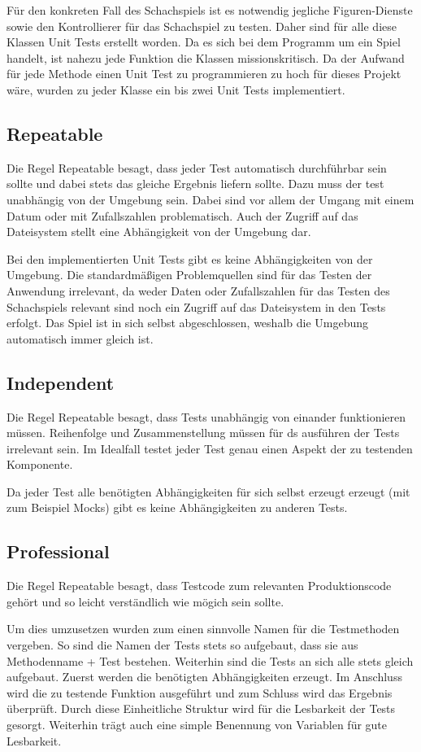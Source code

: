 Für den konkreten Fall des Schachspiels ist es notwendig jegliche Figuren-Dienste sowie den Kontrollierer für das Schachspiel zu testen. Daher sind für alle diese Klassen Unit Tests erstellt worden. Da es sich bei dem Programm um ein Spiel handelt, ist nahezu jede Funktion die Klassen missionskritisch. Da der Aufwand für jede Methode einen Unit Test zu programmieren zu hoch für dieses Projekt wäre, wurden zu jeder Klasse ein bis zwei Unit Tests implementiert.

\subsection{Repeatable}
Die Regel \glqq{}Repeatable\grqq{} besagt, dass jeder Test automatisch durchführbar sein sollte und dabei stets das gleiche Ergebnis liefern sollte. Dazu muss der test unabhängig von der Umgebung sein. Dabei sind vor allem der Umgang mit einem Datum oder mit Zufallszahlen problematisch. Auch der Zugriff auf das Dateisystem stellt eine Abhängigkeit von der Umgebung dar.

Bei den implementierten Unit Tests gibt es keine Abhängigkeiten von der Umgebung. Die standardmäßigen Problemquellen sind für das Testen der Anwendung irrelevant, da weder Daten oder Zufallszahlen für das Testen des Schachspiels relevant sind noch ein Zugriff auf das Dateisystem in den Tests erfolgt. Das Spiel ist in sich selbst abgeschlossen, weshalb die Umgebung automatisch immer gleich ist.

\subsection{Independent}
Die Regel \glqq{}Repeatable\grqq{} besagt, dass Tests unabhängig von einander funktionieren müssen. Reihenfolge und Zusammenstellung müssen für ds ausführen der Tests irrelevant sein. Im Idealfall testet jeder Test genau einen Aspekt der zu testenden Komponente.

Da jeder Test alle benötigten Abhängigkeiten für sich selbst erzeugt erzeugt (mit zum Beispiel Mocks) gibt es keine Abhängigkeiten zu anderen Tests.

\subsection{Professional}
Die Regel \glqq{}Repeatable\grqq{} besagt, dass Testcode zum relevanten Produktionscode gehört und so leicht verständlich wie mögich sein sollte.

Um dies umzusetzen wurden zum einen sinnvolle Namen für die Testmethoden vergeben. So sind die Namen der Tests stets so aufgebaut, dass sie aus Methodenname + \glqq{}Test\grqq{} bestehen. Weiterhin sind die Tests an sich alle stets gleich aufgebaut. Zuerst werden die benötigten Abhängigkeiten erzeugt. Im Anschluss wird die zu testende Funktion ausgeführt und zum Schluss wird das Ergebnis überprüft. Durch diese Einheitliche Struktur wird für die Lesbarkeit der Tests gesorgt.  Weiterhin trägt auch eine simple Benennung von Variablen für gute Lesbarkeit.

